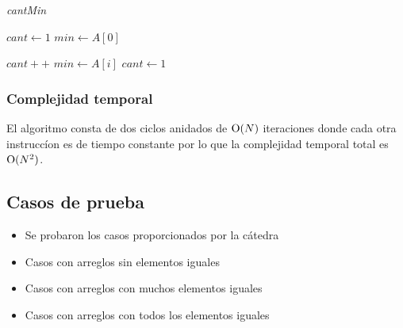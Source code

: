 \bigskip

\begin{algorithm}[H]
	\caption{\textit{cantMin}}

	$cant \gets 1$ \;
	$min \gets A[0]$ \;

     {
    	 {
    		$cant++$ \;
    	}
    	 {
			$min \gets A[i]$ \;
    		$cant \gets 1$ \;
    	}
	}

\end{algorithm}

\bigskip

\subsubsection{Complejidad temporal}

El algoritmo consta de dos ciclos anidados de $\operatorname{O}(N)$ iteraciones donde cada
otra instruccíon es de tiempo constante por lo que la complejidad temporal
total es $\operatorname{O}(N^2)$.

\subsection{Casos de prueba}

\begin{itemize}
\item Se probaron los casos proporcionados por la cátedra
\item Casos con arreglos sin elementos iguales
\item Casos con arreglos con muchos elementos iguales
\item Casos con arreglos con todos los elementos iguales
\end{itemize}